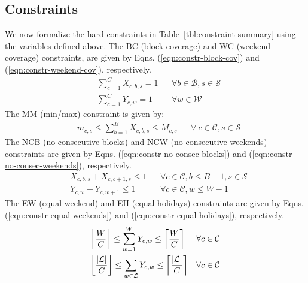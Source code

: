 \subsection{Constraints}\label{sec:meth-constraints}
We now formalize the hard constraints in Table~\ref{tbl:constraint-summary}
using the variables defined above. 
The BC (block coverage) and WC (weekend coverage) constraints, 
are given by Eqns. (\ref{eqn:constr-block-cov}) and (\ref{eqn:constr-weekend-cov}), respectively. 
\begin{align}
&\sum_{c=1}^{C} X_{c, b, s} = 1 &&\forall b\in \mathcal{B}, s \in \mathcal{S} \label{eqn:constr-block-cov} \\
&\sum_{c=1}^{C} Y_{c, w} = 1 &&\forall w\in \mathcal{W} \label{eqn:constr-weekend-cov}
\end{align}
The MM (min/max) constraint is given by:
\begin{align}
&m_{c, s} \leq \sum_{b=1}^{B} X_{c, b, s} \leq M_{c, s} &&\forall\
c\in\mathcal{C}, s\in\mathcal{S} \label{eqn:constr-min-max}
\end{align}
The NCB (no consecutive blocks) and NCW (no consecutive weekends) constraints are 
given by Eqns. (\ref{eqn:constr-no-consec-blocks}) and (\ref{eqn:constr-no-consec-weekends}), respectively.
\begin{align}
&X_{c, b, s} + X_{c, b + 1, s} \leq 1 &&\forall c\in\mathcal{C}, b \leq B - 1,
s\in\mathcal{S} \label{eqn:constr-no-consec-blocks} \\
&Y_{c, w} + Y_{c, w + 1} \leq 1 &&\forall c\in\mathcal{C}, w \leq W - 1 \label{eqn:constr-no-consec-weekends}
\end{align}
The EW (equal weekend) and EH (equal holidays) constraints are given by Eqns. (\ref{eqn:constr-equal-weekends})
and (\ref{eqn:constr-equal-holidays}), respectively.
\begin{align}
&\floor*{\frac{W}{C}} \leq \sum_{w=1}^W Y_{c, w} \leq \ceil*{\frac{W}{C}}
&&\forall c\in\mathcal{C} \label{eqn:constr-equal-weekends} \\
&\floor*{\frac{\abs{\mathcal{L}}}{C}} \leq \sum_{w\in\mathcal{L}} Y_{c, w} \leq
\ceil*{\frac{\abs{\mathcal{L}}}{C}} &&\forall c\in\mathcal{C}
\label{eqn:constr-equal-holidays}
\end{align}



